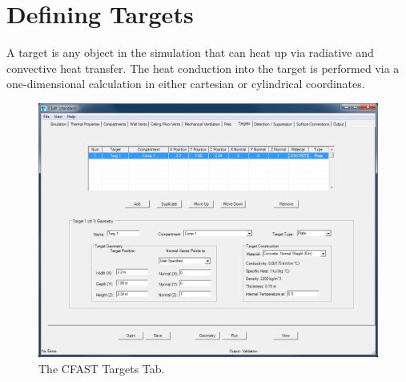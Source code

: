 \chapter{Defining Targets}
\label{chapter:targets}

A target is any object in the simulation that can heat up via radiative and convective heat transfer. The heat conduction into the target is performed via a one-dimensional calculation in either cartesian or cylindrical coordinates.

\begin{figure}[h!]
\begin{center}
\includegraphics[width=6.5in]{FIGURES/Target_Tab}
\caption[The CFAST Targets Tab]{The CFAST Targets Tab.}
\end{center}
\end{figure}

